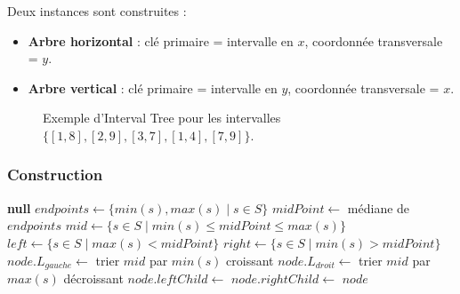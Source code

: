 \documentclass[11pt,a4paper]{article}
\begin{document}
Deux instances sont construites :
\begin{itemize}
    \item \textbf{Arbre horizontal} : clé primaire = intervalle en $x$, coordonnée transversale = $y$.
    \item \textbf{Arbre vertical} : clé primaire = intervalle en $y$, coordonnée transversale = $x$.
\end{itemize}

\begin{figure}[h]
\centering
{}
\caption{Exemple d'Interval Tree pour les intervalles $\{[1,8],[2,9],[3,7],[1,4],[7,9]\}$.}
\label{fig:it}
\end{figure}

\subsubsection{Construction}

\begin{algorithm}[H]
\caption{Construction de l'Interval Tree}
\begin{algorithmic}[1]
     \Return \textbf{null} \EndIf
    \State $endpoints \gets \{ min(s), max(s) \mid s \in S \}$
    \State $midPoint \gets$ médiane de $endpoints$
    \State $mid   \gets \{ s \in S \mid min(s) \leq midPoint \leq max(s) \}$
    \State $left  \gets \{ s \in S \mid max(s) < midPoint \}$
    \State $right \gets \{ s \in S \mid min(s) > midPoint \}$
    \State $node.L_{gauche}  \gets$ trier $mid$ par $min(s)$ croissant
    \State $node.L_{droit}   \gets$ trier $mid$ par $max(s)$ décroissant
    \State $node.leftChild  \gets$ 
    \State $node.rightChild \gets$ 
    \State \Return $node$
\EndProcedure
\end{algorithmic}
\end{algorithm}
\end{document}
